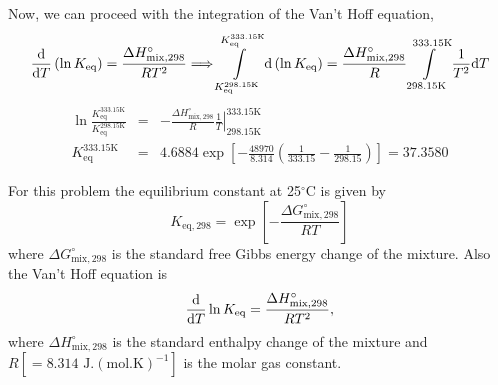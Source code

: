 \documentclass[calculator,allquestions,datasheet,solutions]{exam_newMarcus2}
\newcommand{\frc}{\displaystyle\frac}
\renewcommand{\d}[1]{\mathrm{d} #1 }
\begin{document}
\begin{question}
\begin{enumerate}[(a)]
{\begin{displaymath}
          \end{displaymath}
           Now, we can proceed with the integration of the Van't Hoff equation,~
          \begin{displaymath} 
              \frc{\d}{\d T} \left(\ln{K_{\text{eq}}}\right) = \frc{\Delta H^{\circ}_{\text{mix},298}}{RT^{2}} \Longrightarrow \int\limits_{K_{\text{eq}}^{298.15\text{K}}}^{K_{\text{eq}}^{333.15\text{K}}} \d\left(\ln{K_{\text{eq}}}\right) = \frc{\Delta H^{\circ}_{\text{mix},298}}{R}\int\limits_{298.15\text{K}}^{333.15\text{K}}\frc{1}{T^{2}}\d T
          \end{displaymath}
          \begin{eqnarray}
              \ln{\frc{K_{\text{eq}}^{333.15\text{K}}}{K_{\text{eq}}^{298.15\text{K}}}} &=& -\frc{\Delta H^{\circ}_{\text{mix},298}}{R} \left.\frc{1}{T}\right|_{298.15\text{K}}^{333.15\text{K}} \nonumber \\
             K_{\text{eq}}^{333.15\text{K}} &=&  4.6884 \exp{ \left[-\frc{48970}{8.314}\left(\frc{1}{333.15} - \frc{1}{298.15}\right)\right] } = 37.3580 \nonumber 
           \end{eqnarray}

}
%
\end{enumerate}
        For this problem the equilibrium constant at 25$^{\circ}$C is given by
          \begin{displaymath}
              K_{\text{eq},298} = \exp{\left[-\frc{\Delta G^{\circ}_{\text{mix},298}}{R T}\right]}
          \end{displaymath}
          where $\Delta G^{\circ}_{\text{mix},298}$ is the standard free Gibbs energy change of the mixture. Also the Van't Hoff equation is
          \begin{displaymath}
               \frc{\d}{\d T} \ln{K_{\text{eq}}} = \frc{\Delta H^{\circ}_{\text{mix},298}}{RT^{2}},
          \end{displaymath}
          where $\Delta H^{\circ}_{\text{mix},298}$ is the standard enthalpy change of the mixture and $R\left[=\text{8.314 J.}\left(\text{mol.K}\right)^{-1}\right]$ is the molar gas constant.
%
\end{question}

\clearpage
\end{document}
